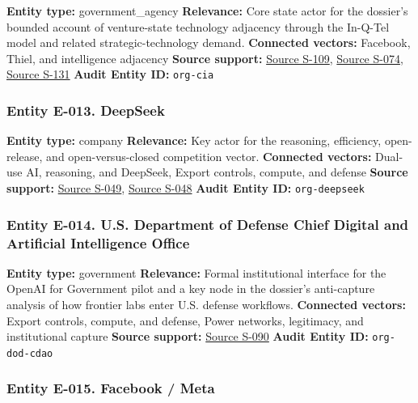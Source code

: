 \documentclass[
  american,
  11pt,
  letterpaper,
]{article}
\begin{document}
\textbf{Entity type:} government\_agency \textbf{Relevance:} Core state
actor for the dossier's bounded account of venture-state technology
adjacency through the In-Q-Tel model and related strategic-technology
demand. \textbf{Connected vectors:} Facebook, Thiel, and intelligence
adjacency \textbf{Source support:}
\hyperref[source-s-109-in-q-tel-the-central-intelligence-agency-as-venture-capitalist]{Source
S-109}, \hyperref[source-s-074-in-q-tel]{Source S-074},
\hyperref[source-s-131-it-pays-to-play-with-the-cia]{Source S-131}
\textbf{Audit Entity ID:} \texttt{org-cia}

\subsubsection{Entity E-013. DeepSeek}\label{entity-e-013-deepseek}

\textbf{Entity type:} company \textbf{Relevance:} Key actor for the
reasoning, efficiency, open-release, and open-versus-closed competition
vector. \textbf{Connected vectors:} Dual-use AI, reasoning, and
DeepSeek, Export controls, compute, and defense \textbf{Source support:}
\hyperref[source-s-049-deepseek-v3-technical-report]{Source S-049},
\hyperref[source-s-048-deepseek-r1-incentivizing-reasoning-capability-in-llms-via-reinforcement-learning]{Source
S-048} \textbf{Audit Entity ID:} \texttt{org-deepseek}

\subsubsection{Entity E-014. U.S. Department of Defense Chief Digital
and Artificial Intelligence
Office}\label{entity-e-014-u-s-department-of-defense-chief-digital-and-artificial-intelligence-office}

\textbf{Entity type:} government \textbf{Relevance:} Formal
institutional interface for the OpenAI for Government pilot and a key
node in the dossier's anti-capture analysis of how frontier labs enter
U.S. defense workflows. \textbf{Connected vectors:} Export controls,
compute, and defense, Power networks, legitimacy, and institutional
capture \textbf{Source support:}
\hyperref[source-s-090-introducing-openai-for-government]{Source S-090}
\textbf{Audit Entity ID:} \texttt{org-dod-cdao}

\subsubsection{Entity E-015. Facebook /
Meta}\label{entity-e-015-facebook-meta}
\end{document}
